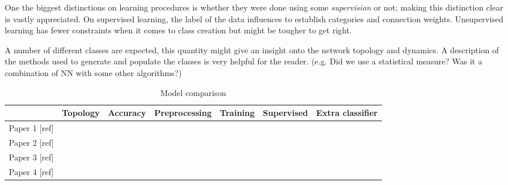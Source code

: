 One the biggest distinctions on learning procedures is whether they were done using some \emph{supervision} or not; making this distinction clear is vastly appreciated. On supervised learning, the label of the data influences to establish categories and connection weights. Unsupervised learning has fewer constraints when it comes to class creation but might be tougher to get right. 

A number of different classes are expected, this quantity might give an insight onto the network topology and dynamics. A description of the methods used to generate and populate the classes is very helpful for the reader. (e.g. Did we use a statistical measure? Was it a combination of NN with some other algorithms?)

\begin{table*}
  \caption{Model comparison}
  \begin{center}
    \bgroup
    \def\arraystretch{1.4}
    \begin{tabular}{ l | c c c c c c }
      $ $ &
      \begin{minipage}{1.9cm}\centering Topology \end{minipage} & 
      \begin{minipage}{1.9cm}\centering Accuracy \end{minipage} & 
      \begin{minipage}{1.9cm}\centering Preprocessing \end{minipage} &
      \begin{minipage}{1.9cm}\centering Training \end{minipage} & 
      \begin{minipage}{1.9cm}\centering Supervised \end{minipage} &
      \begin{minipage}{1.9cm}\centering Extra classifier \end{minipage} \\
      \hline
      \begin{minipage}{2cm} Paper 1 [ref] \end{minipage}  & & & & & & \\
      \begin{minipage}{2cm} Paper 2 [ref]\end{minipage}  & & & & & & \\
      \begin{minipage}{2cm} Paper 3 [ref]\end{minipage}  & & & & & & \\
      \begin{minipage}{2cm} Paper 4 [ref]\end{minipage}  & & & & & & 
    \end{tabular}
    \egroup
  \end{center}
  \label{tb:software_comparison}
\end{table*}


